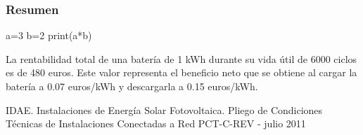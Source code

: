\documentclass{article}
\begin{document}
\subsubsection*{Resumen}

a=3
b=2
print(a*b)


La rentabilidad total de una batería de 1 kWh durante su vida útil de 6000 ciclos es de 480 euros. Este valor representa el beneficio neto que se obtiene al cargar la batería a 0.07 euros/kWh y descargarla a 0.15 euros/kWh.




\begin{thebibliography}{9}
    IDAE. 
    Instalaciones de
Energía Solar Fotovoltaica.
Pliego de Condiciones Técnicas de
Instalaciones Conectadas a Red
PCT-C-REV - julio 2011

\end{thebibliography}
\end{document}
